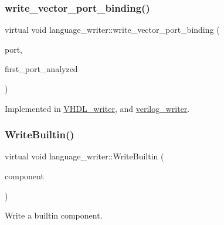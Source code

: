 \mbox{\label{classlanguage__writer_a97f0527b8b3b510dc254108379edf440}} 
\subsubsection{\texorpdfstring{write\+\_\+vector\+\_\+port\+\_\+binding()}{write\_vector\_port\_binding()}}
{\footnotesize\ttfamily virtual void language\+\_\+writer\+::write\+\_\+vector\+\_\+port\+\_\+binding (\begin{DoxyParamCaption}\item[{const \hyperlink{structural__objects_8hpp_a8ea5f8cc50ab8f4c31e2751074ff60b2}{structural\+\_\+object\+Ref} \&}]{port,  }\item[{bool \&}]{first\+\_\+port\+\_\+analyzed }\end{DoxyParamCaption})\hspace{0.3cm}{\ttfamily [pure virtual]}}



Implemented in \hyperlink{structVHDL__writer_a8930dbb88b219d4ab659d65925541684}{V\+H\+D\+L\+\_\+writer}, and \hyperlink{classverilog__writer_ab9c4a8bd3452e3bb5d3efd13638b48c3}{verilog\+\_\+writer}.

\mbox{\label{classlanguage__writer_a30538fe1dc72928281e409f7684ced83}} 
\subsubsection{\texorpdfstring{Write\+Builtin()}{WriteBuiltin()}}
{\footnotesize\ttfamily virtual void language\+\_\+writer\+::\+Write\+Builtin (\begin{DoxyParamCaption}\item[{const structural\+\_\+object\+Const\+Ref}]{component }\end{DoxyParamCaption})\hspace{0.3cm}{\ttfamily [pure virtual]}}



Write a builtin component. 


